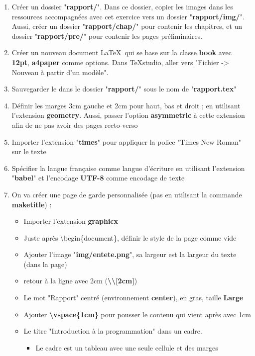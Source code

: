 \documentclass[11pt, a4paper]{article}
\begin{document}
\begin{enumerate}
	\item Créer un dossier "\textbf{rapport/}". Dans ce dossier, copier les images dans les ressources accompagnées avec cet exercice vers un dossier "\textbf{rapport/img/}". Aussi, créer un dossier "\textbf{rapport/chap/}" pour contenir les chapitres, et un dossier "\textbf{rapport/pre/}" pour contenir les pages préliminaires. 
	\item Créer un nouveau document \LaTeX\ qui se base sur la classe \textbf{book} avec \textbf{12pt}, \textbf{a4paper} comme options. Dans TeXstudio, aller vers "Fichier -> Nouveau à partir d'un modèle".
	\item Sauvegarder le  dans le dossier "\textbf{rapport/}" sous le nom de "\textbf{rapport.tex}"
	\item Définir les marges 3cm gauche et 2cm pour haut, bas et droit ; en utilisant l'extension \textbf{geometry}. Aussi, passer l'option \textbf{asymmetric} à cette extension afin de ne pas avoir des pages recto-verso
	\item Importer l'extension "\textbf{times}" pour appliquer la police "Times New Roman" sur le texte 
	\item Spécifier la langue française comme langue d'écriture en utilisant l'extension "\textbf{babel}" et l'encodage \textbf{UTF-8} comme encodage de texte
	\item On va créer une page de garde personnalisée (pas en utilisant la commande \textbf{maketitle}) : 
	\begin{multicols}{2}
		\begin{itemize}
			\item Importer l'extension \textbf{graphicx}
			\item Juste après \textbackslash begin\{document\}, définir le style de la page comme vide
			\item Ajouter l'image "\textbf{img/entete.png}", sa largeur est la largeur du texte (dans la page)
			\item retour à la ligne avec 2cm (\textbf{\textbackslash\textbackslash[2cm]})
			\item Le mot "Rapport" centré (environnement \textbf{center}), en gras, taille \textbf{Large}
			\item Ajouter \textbf{\textbackslash vspace\{1cm\}} pour pousser le contenu qui vient après avec 1cm
			\item Le titre "Introduction à la programmation" dans un cadre. 
			\begin{itemize}
				\item Le cadre est un tableau avec une seule cellule et des marges

\end{itemize}
\end{itemize}
\end{multicols}
\end{enumerate}
\end{document}
